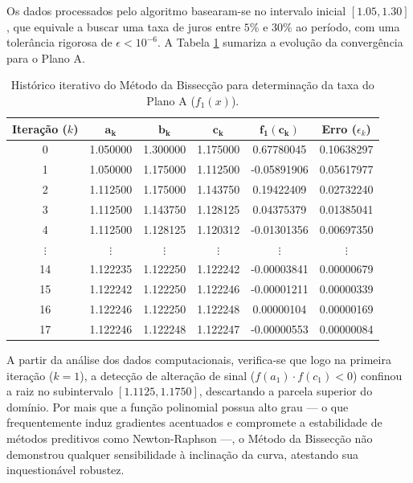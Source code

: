 Os dados processados pelo algoritmo basearam-se no intervalo inicial $[1.05, 1.30]$, que equivale a buscar uma taxa de juros entre $5\%$ e $30\%$ ao período, com uma tolerância rigorosa de $\epsilon < 10^{-6}$. A Tabela \ref{tab:bisseccao_juros} sumariza a evolução da convergência para o Plano A.

\begin{table}[htpb]
\centering
\caption{Histórico iterativo do Método da Bissecção para determinação da taxa do Plano A ($f_1(x)$).}
\label{tab:bisseccao_juros}
\small
\begin{tabular}{@{}cccccc@{}}
\toprule
\textbf{Iteração ($k$)} & $\mathbf{a_k}$ & $\mathbf{b_k}$ & $\mathbf{c_k}$ & $\mathbf{f_1(c_k)}$ & \textbf{Erro} ($\epsilon_k$) \\ \midrule
0  & 1.050000 & 1.300000 & 1.175000 & \phantom{-}0.67780045 & 0.10638297 \\
1  & 1.050000 & 1.175000 & 1.112500 & -0.05891906           & 0.05617977 \\
2  & 1.112500 & 1.175000 & 1.143750 & \phantom{-}0.19422409 & 0.02732240 \\
3  & 1.112500 & 1.143750 & 1.128125 & \phantom{-}0.04375379 & 0.01385041 \\
4  & 1.112500 & 1.128125 & 1.120312 & -0.01301356           & 0.00697350 \\
$\vdots$ & $\vdots$ & $\vdots$ & $\vdots$ & $\vdots$          & $\vdots$   \\
14 & 1.122235 & 1.122250 & 1.122242 & -0.00003841           & 0.00000679 \\
15 & 1.122242 & 1.122250 & 1.122246 & -0.00001211           & 0.00000339 \\
16 & 1.122246 & 1.122250 & 1.122248 & \phantom{-}0.00000104 & 0.00000169 \\
17 & 1.122246 & 1.122248 & 1.122247 & -0.00000553           & 0.00000084 \\ \bottomrule
\end{tabular}
\end{table}

A partir da análise dos dados computacionais, verifica-se que logo na primeira iteração ($k=1$), a detecção de alteração de sinal ($f(a_1) \cdot f(c_1) < 0$) confinou a raiz no subintervalo $[1.1125, 1.1750]$, descartando a parcela superior do domínio. Por mais que a função polinomial possua alto grau — o que frequentemente induz gradientes acentuados e compromete a estabilidade de métodos preditivos como Newton-Raphson —, o Método da Bissecção não demonstrou qualquer sensibilidade à inclinação da curva, atestando sua inquestionável robustez.

